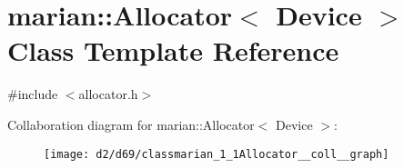 \hypertarget{classmarian_1_1Allocator}{}\section{marian\+:\+:Allocator$<$ Device $>$ Class Template Reference}
\label{classmarian_1_1Allocator}


{\ttfamily \#include $<$allocator.\+h$>$}



Collaboration diagram for marian\+:\+:Allocator$<$ Device $>$\+:
\nopagebreak
\begin{figure}[H]
\begin{center}
\leavevmode
\texttt{[image: d2/d69/classmarian\_1\_1Allocator\_\_coll\_\_graph]}
\end{center}
\end{figure}
